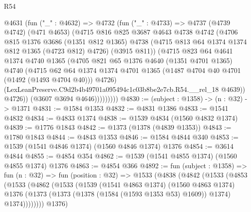\begin{lexlean}{R54}
\begin{coremodule}
              @4631
                (fun ("_" : @4632) =>
                @4732
                  (fun ("_" : @4733) =>
                  @4737
                    (@4739 @4742)
                    (@471 @4653)
                    (@4715
                      @816
                      @825
                      @3687
                      @4643
                      @4738
                      @4742
                      (@4706
                        @815
                        @1376
                        @3686
                        (@1351 @812 @1365)
                        @4738
                        (@4715 @813 @64 @1374 @1374 @812 @1365 (@4723 @812) @4726)
                        (@3915 @811))
                      (@4715
                        @823
                        @64
                        @4641
                        @1374
                        @4740
                        @1365
                        (@4705
                          @821
                          @65
                          @1376
                          @4640
                          (@1351 @4701 @1365)
                          @4740
                          (@4715
                            @62
                            @64
                            @1374
                            @1374
                            @4701
                            @1365
                            (@1487 @4704 @40 @4701 (@1492 (@1493 @4704 @40)))
                            @4726)
                          (LexLeanPreserve.C9d2b4b49701a095494c1c03b8be2e7cb.R54.__rel_18 @4639))
                        @4726))
                    (@3607 @3694 @4646)))))))))
@4830 := (subject : @1358) -> (n : @32) -> @1371
@4831 := @1584 @1353
@4832 := @4831 @1386
@4833 := @1541 @4832
@4834 := @4833 @1374
@4838 := @1539 @4834 (@1560 @4832 @1374)
@4839 := @1776 @1843
@4842 := @1373 (@1378 (@4839 @1353))
@4843 := @1780 @1843
@4844 := @4843 @1353
@4846 := @1584 @4844 @340
@4853 := @1539 (@1541 @4846 @1374) (@1560 @4846 @1374) @1376
@4854 := @3614 @4844
@4855 := @4854 @354
@4862 := @1539 (@1541 @4855 @1374) (@1560 @4855 @1374) @1376
@4863 := @4854 @366
@4892 := fun (subject : @1358) =>
  fun (n : @32) =>
  fun (position : @32) =>
  @1533
    (@4838
      (@4842
        (@1533
          (@4853
            (@1533
              (@4862
                (@1533
                  (@1539
                    (@1541 @4863 @1374)
                    (@1560 @4863 @1374)
                    @1376
                    (@1373 (@1373 (@1378 (@1584 (@1593 @1353 @53) @1609)) @1374) @1374))))))))
      @1376)

\end{coremodule}
\end{lexlean}
